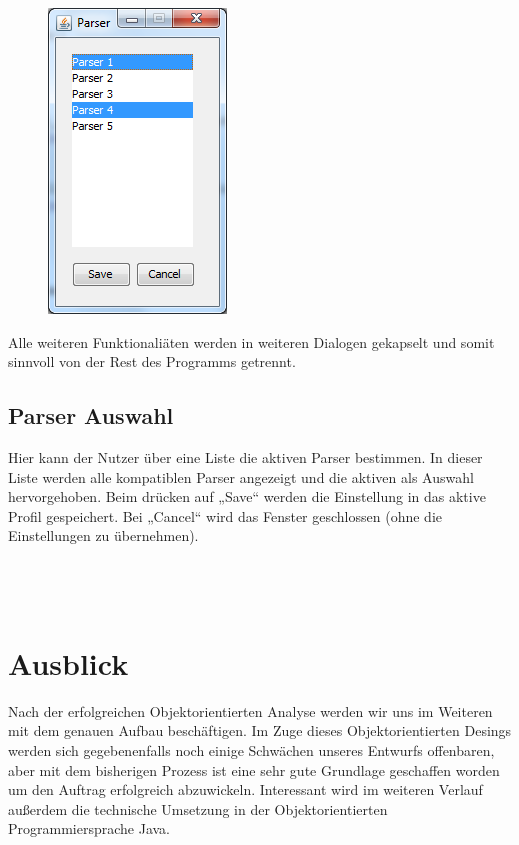 \documentclass[a4paper,11pt,abstracton,titlepage]{scrartcl}
\begin{document}
\begin{figure}
	\includegraphics{parser.png}
\end{figure}

Alle weiteren Funktionaliäten werden in weiteren Dialogen gekapselt und somit
sinnvoll von der Rest des Programms getrennt.

\subsection{Parser Auswahl}
Hier kann der Nutzer über eine Liste die aktiven Parser bestimmen.
In dieser Liste werden alle kompatiblen Parser angezeigt und die aktiven als
Auswahl hervorgehoben.
Beim drücken auf „Save“ werden die Einstellung in das aktive Profil gespeichert.
Bei „Cancel“ wird das Fenster geschlossen (ohne die Einstellungen zu
übernehmen).%
\\\\\\\\

\newpage

\section{Ausblick}
Nach der erfolgreichen Objektorientierten Analyse werden wir uns im Weiteren mit
dem genauen Aufbau beschäftigen. Im Zuge dieses Objektorientierten Desings
werden sich gegebenenfalls noch einige Schwächen unseres Entwurfs offenbaren,
aber mit dem bisherigen Prozess ist eine sehr gute Grundlage geschaffen worden
um den Auftrag erfolgreich abzuwickeln. Interessant wird im weiteren Verlauf
außerdem die technische Umsetzung in der Objektorientierten Programmiersprache 
Java.
\end{document}
